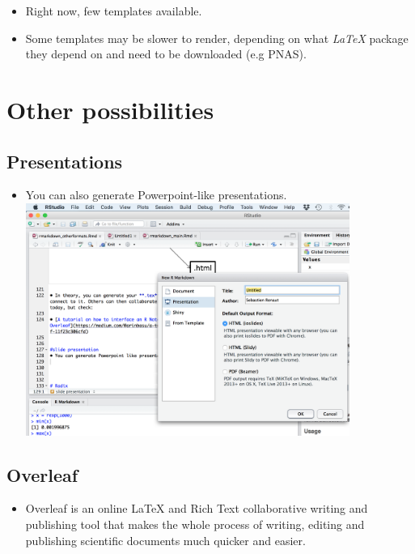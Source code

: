 \documentclass[]{article}
\providecommand{\tightlist}{%
  \setlength{\itemsep}{0pt}\setlength{\parskip}{0pt}}
\begin{document}
\begin{itemize}
\item
  Right now, few templates available.
\item
  Some templates may be slower to render, depending on what \emph{LaTeX}
  package they depend on and need to be downloaded (e.g PNAS).
\end{itemize}

\hypertarget{other-possibilities}{%
\section{Other possibilities}\label{other-possibilities}}

\hypertarget{presentations}{%
\subsection{Presentations}\label{presentations}}

\begin{itemize}
\tightlist
\item
  You can also generate Powerpoint-like presentations.\\
  \includegraphics[width=4.16667in,height=\textheight]{../figures/slides.png}
\end{itemize}

\hypertarget{overleaf}{%
\subsection{Overleaf}\label{overleaf}}

\begin{itemize}
\tightlist
\item
  Overleaf is an online LaTeX and Rich Text collaborative writing and
  publishing tool that makes the whole process of writing, editing and
  publishing scientific documents much quicker and easier.
\end{itemize}
\end{document}
